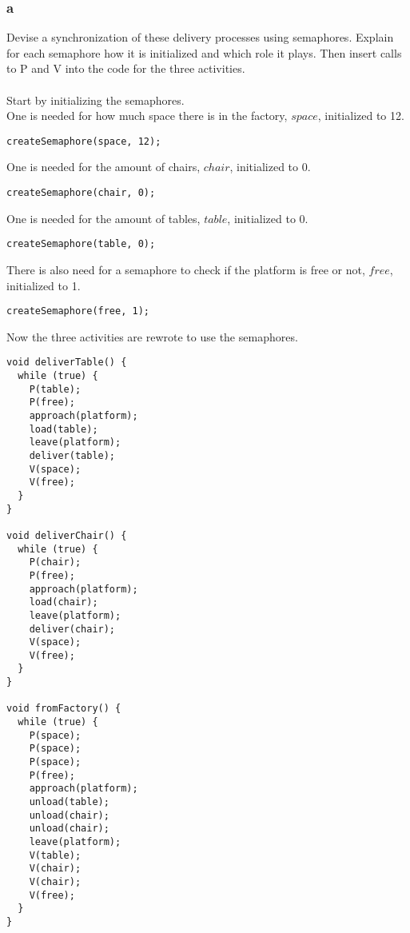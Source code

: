 \documentclass[12pt]{article}
\begin{document}
\subsubsection{a}
Devise a synchronization of these delivery processes using semaphores. Explain for each
semaphore how it is initialized and which role it plays. Then insert calls to P and V into
the code for the three activities.\\
\\
Start by initializing the semaphores.\\
One is needed for how much space there is in the factory, $space$, initialized to 12.
\begin{verbatim}
createSemaphore(space, 12);
\end{verbatim}
One is needed for the amount of chairs, $chair$, initialized to 0.
\begin{verbatim}
createSemaphore(chair, 0);
\end{verbatim}
One is needed for the amount of tables, $table$, initialized to 0.
\begin{verbatim}
createSemaphore(table, 0);
\end{verbatim}
There is also need for a semaphore to check if the platform is free or not, $free$, initialized to 1.
\begin{verbatim}
createSemaphore(free, 1);
\end{verbatim}
Now the three activities are rewrote to use the semaphores.
\begin{verbatim}
void deliverTable() {
  while (true) {
    P(table);
    P(free);
    approach(platform);
    load(table);
    leave(platform);
    deliver(table);
    V(space);
    V(free);
  }
}

void deliverChair() {
  while (true) {
    P(chair);
    P(free);
    approach(platform);
    load(chair);
    leave(platform);
    deliver(chair);
    V(space);
    V(free);
  }
}

void fromFactory() {
  while (true) {
    P(space);
    P(space);
    P(space);
    P(free);
    approach(platform);
    unload(table);
    unload(chair);
    unload(chair);
    leave(platform);
    V(table);
    V(chair);
    V(chair);
    V(free);
  }
}
\end{verbatim}
\end{document}
